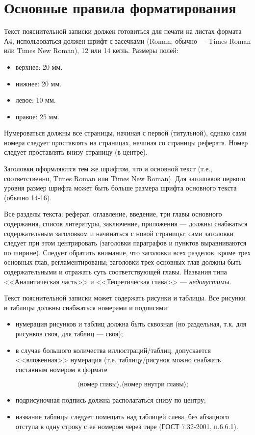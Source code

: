 ﻿\chapter{Основные правила форматирования}\label{app-format}

Текст пояснительной записки должен готовиться для печати на листах формата А4, использоваться должен шрифт с засечками (Roman; обычно --- Times Roman или Times New Roman), 12 или 14 кегль. Размеры полей:

\begin{itemize}
	\item верхнее: 20 мм.
	\item нижнее: 20 мм.
	\item левое: 10 мм.
	\item правое: 25 мм.
\end{itemize}

Нумероваться должны все страницы, начиная с первой (титульной), однако сами номера следует проставлять на страницах, начиная со страницы реферата. Номер следует проставлять внизу страницу (в центре).

Заголовки оформляются тем же шрифтом, что и основной текст (т.е., соответственно, Times Roman или Times New Roman). Для заголовков первого уровня размер шрифта может быть больше размера шрифта основного текста (обычно 14-16).

Все разделы текста: реферат, оглавление, введение, три главы основного
содержания, список литературы, заключение, приложения --- должны снабжаться
содержательным заголовком и начинаться с новой страницы; сами заголовки следует
при этом центрировать (заголовки параграфов и пунктов выравниваются по ширине).
Следует обратить внимание, что заголовки всех разделов, кроме трех основных
глав, регламентированы; заголовки трех основных глав должны быть содержательными
и отражать суть соответствующей главы. Названия типа <<Аналитическая часть>> и <<Теоретическая глава>> --- \textit{недопустимы}.

Текст пояснительной записки может содержать рисунки и таблицы. Все рисунки и
таблицы должны снабжаться номерами и подписями:

\begin{itemize}

	\item нумерация рисунков и таблиц должна быть сквозная (но раздельная, т.к. для рисунков своя, для таблиц --- своя);

	\item в случае большого количества иллюстраций/таблиц, допускается <<вложенная>> нумерация (т.е. таблицу/рисунок можно снабжать составным номером в формате

	      $$\langle\mbox{номер главы}\rangle.\langle\mbox{номер внутри главы}\rangle;$$

	\item подрисуночная подпись должна располагаться снизу по центру;

	\item название таблицы следует помещать над таблицей слева, без абзацного
	      отступа в одну строку с ее номером через тире (ГОСТ 7.32-2001, п.6.6.1).

\end{itemize}

